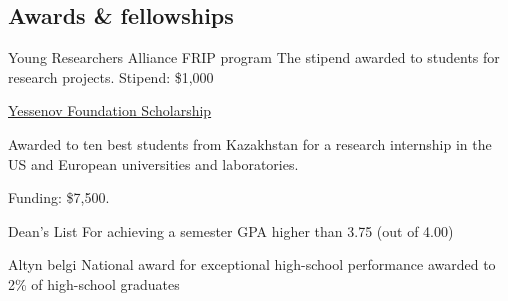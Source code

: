 \documentclass[10pt]{article} %
\begin{document}
\begin{paracol}{1}


\section{Awards \& fellowships}





	
	
	{Young Researchers Alliance FRIP program}
	{The stipend awarded to students for research projects. Stipend: \$1,000}
	
	
	
	{\href{http://yessenovfoundation.org/en/}{Yessenov Foundation Scholarship}}
	{Awarded to ten best students from Kazakhstan for a research  internship in the US and European universities and laboratories. 
	
	Funding: \$7,500.}
	
	{Dean’s List}
	{For achieving a semester GPA higher than 3.75 (out of 4.00)}
	
	{Altyn belgi}
	{National award for exceptional high-school performance awarded to 2\% of high-school graduates}
	




\end{paracol}
\end{document}
